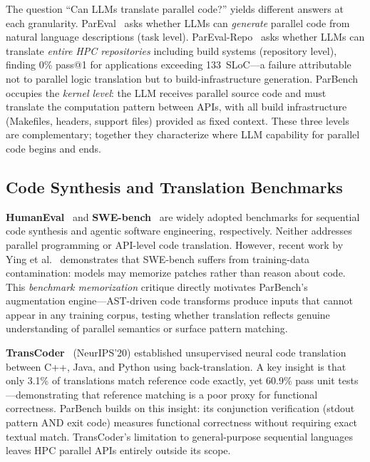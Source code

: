 \documentclass[conference]{IEEEtran}
\begin{document}
The question ``Can LLMs translate parallel code?'' yields different answers at each granularity. ParEval~\cite{ParEval2024} asks whether LLMs can \emph{generate} parallel code from natural language descriptions (task level). ParEval-Repo~\cite{ParEvalRepo2025} asks whether LLMs can translate \emph{entire HPC repositories} including build systems (repository level), finding 0\% pass@1 for applications exceeding 133~SLoC---a failure attributable not to parallel logic translation but to build-infrastructure generation. ParBench occupies the \emph{kernel level}: the LLM receives parallel source code and must translate the computation pattern between APIs, with all build infrastructure (Makefiles, headers, support files) provided as fixed context. These three levels are complementary; together they characterize where LLM capability for parallel code begins and ends.

\subsection{Code Synthesis and Translation Benchmarks}
\label{sec:synthesis-benchmarks}

\textbf{HumanEval}~\cite{HumanEval2021} and \textbf{SWE-bench}~\cite{SWEbench2024} are widely adopted benchmarks for sequential code synthesis and agentic software engineering, respectively. Neither addresses parallel programming or API-level code translation. However, recent work by Ying et al.~\cite{SWEbenchIllusion2025} demonstrates that SWE-bench suffers from training-data contamination: models may memorize patches rather than reason about code. This \emph{benchmark memorization} critique directly motivates ParBench's augmentation engine---AST-driven code transforms produce inputs that cannot appear in any training corpus, testing whether translation reflects genuine understanding of parallel semantics or surface pattern matching.

\textbf{TransCoder}~\cite{TransCoder2020} (NeurIPS'20) established unsupervised neural code translation between C++, Java, and Python using back-translation. A key insight is that only 3.1\% of translations match reference code exactly, yet 60.9\% pass unit tests---demonstrating that reference matching is a poor proxy for functional correctness. ParBench builds on this insight: its conjunction verification (stdout pattern AND exit code) measures functional correctness without requiring exact textual match. TransCoder's limitation to general-purpose sequential languages leaves HPC parallel APIs entirely outside its scope.
\end{document}
